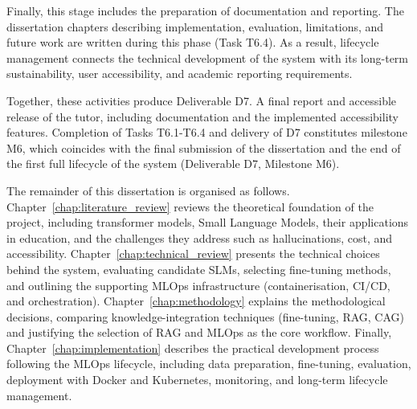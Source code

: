 Finally, this stage includes the preparation of documentation and reporting. The dissertation chapters describing implementation, evaluation, limitations, and future work are written during this phase (Task T6.4). As a result, lifecycle management connects the technical development of the system with its long-term sustainability, user accessibility, and academic reporting requirements.

Together, these activities produce Deliverable D7. A final report and accessible release of the tutor, including documentation and the implemented accessibility features. Completion of Tasks T6.1-T6.4 and delivery of D7 constitutes milestone M6, which coincides with the final submission of the dissertation and the end of the first full lifecycle of the system (Deliverable D7, Milestone M6).

The remainder of this dissertation is organised as follows.
Chapter~\ref{chap:literature_review} reviews the theoretical foundation of the project, including transformer models, Small Language Models, their applications in education, and the challenges they address such as hallucinations, cost, and accessibility.
Chapter~\ref{chap:technical_review} presents the technical choices behind the system, evaluating candidate SLMs, selecting fine-tuning methods, and outlining the supporting MLOps infrastructure (containerisation, CI/CD, and orchestration).
Chapter~\ref{chap:methodology} explains the methodological decisions, comparing knowledge-integration techniques (fine-tuning, RAG, CAG) and justifying the selection of RAG and MLOps as the core workflow.
Finally, Chapter~\ref{chap:implementation} describes the practical development process following the MLOps lifecycle, including data preparation, fine-tuning, evaluation, deployment with Docker and Kubernetes, monitoring, and long-term lifecycle management.

